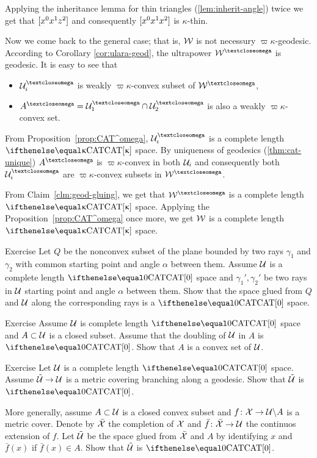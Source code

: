 Applying the inheritance lemma for thin triangles (\ref{lem:inherit-angle}) twice 
we get that $[{x^0}{x^1}{z^2}]$ 
and consequently $[{x^0}{x^1}{x^2}]$ is $\kappa$-thin.
\claimqeds

Now we come back to the general case;
that is, $\mathcal{W}$ is not necessury $\varpi\kappa$-geodesic.
According to Corollary \ref{cor:ulara-geod},
the ultrapower $\spc{W}^\o$ is geodesic.
It is easy to see that 
\begin{itemize}
\item $\spc{U}_i^\o$ is weakly $\varpi\kappa$-convex subset of $\spc{W}^\o$,
\item $A^\o=\spc{U}_1^\o\cap\spc{U}_2^\o$ is also a weakly $\varpi\kappa$-convex set.
\end{itemize}
From Proposition~\ref{prop:CAT^omega}, $\spc{U}_i^\o$ is a complete length $\CAT\kappa$ space.
By uniqueness of geodesics (\ref{thm:cat-unique})
 $A^\o$ is $\varpi\kappa$-convex in both $\mathcal{U}_i$ and
consequently both $\spc{U}_i^\o$ are $\varpi\kappa$-convex subsets in $\spc{W}^\o$.

From Claim~\ref{clm:geod-gluing}, 
we get that $\spc{W}^\o$ is a complete length $\CAT\kappa$ space.
Applying the Proposition~\ref{prop:CAT^omega} once more, 
we get $\mathcal{W}$ is a complete length $\CAT\kappa$ space.
\qeds 

\begin{thm}{Exercise}\label{ex:two-rays}
Let $Q$ be the nonconvex subset of the plane 
bounded by two rays $\gamma_1$ and $\gamma_2$
with common starting point and angle $\alpha$ between them.
Assume $\mathcal{U}$ is a complete length $\CAT0$ space
and $\gamma_1',\gamma_2'$ be two rays in $\mathcal{U}$
starting point and angle $\alpha$ between them.
Show that the space glued from $Q$ and $\mathcal{U}$ along the corresponding rays is a $\CAT{0}$ space.
\end{thm}

\begin{thm}{Exercise}\label{ex:reshetnyak-doubling}
Assume $\mathcal{U}$ is complete length $\CAT0$ space and $A\subset \spc{U}$ is a closed subset.
Assume that the doubling of $\mathcal{U}$ in $A$ is $\CAT0$. 
Show that $A$ is a convex set of $\mathcal{U}$.
\end{thm}

\begin{thm}{Exercise} Let $\mathcal{U}$ is a complete length $\CAT0$ space.
Assume $\tilde{\spc{U}}\to \spc{U}$ is a metric covering branching along a geodesic.
Show that $\tilde{\mathcal{U}}$ is $\CAT0$.

More generally, assume $A\subset \spc{U}$ is a closed convex subset and $f\:\spc{X}\to \spc{U}\backslash A$ is a metric cover.
Denote by $\bar{\mathcal{X}}$ the completion of $\mathcal{X}$ and 
$\bar f\:\bar{\spc{X}}\to \spc{U}$ the continuos extension of $f$.
Let $\tilde{\mathcal{U}}$ be the space glued from $\bar{\mathcal{X}}$ and $A$ by identifying $x$ and $\bar f(x)$ if $\bar f(x)\in A$.
Show that $\tilde{\mathcal{U}}$ is $\CAT0$.
\end{thm}



